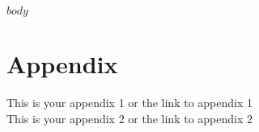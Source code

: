 \documentclass[a4paper]{article}
\begin{document}
\beginingpreprint


$body$


\printbibliography[notcategory=ignore]

\section*{Appendix}
This is your appendix 1 or the link to appendix 1 \\
This is your appendix 2 or the link to appendix 2
\end{document}
